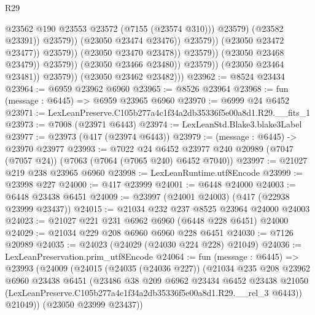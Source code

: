 \begin{lexlean}{R29}
\begin{coremodule}
                                                      @23562
                                                      @190
                                                      @23553
                                                      @23572
                                                      (@7155 (@23574 @310)))
                                                    @23579)
                                                  (@23582 @23391))
                                                @23579))
                                            (@23050 @23474 @23476))
                                          @23579))
                                      (@23050 @23472 @23477))
                                    @23579))
                                (@23050 @23470 @23478))
                              @23579))
                          (@23050 @23468 @23479))
                        @23579))
                    (@23050 @23466 @23480))
                  @23579))
              (@23050 @23464 @23481))
            @23579))
        (@23050 @23462 @23482)))
@23962 := @8524 @23434
@23964 := @6959 @23962 @6960
@23965 := @8526 @23964
@23968 := fun (message : @6445) => @6959 @23965 @6960
@23970 := @6999 @24 @6452
@23971 := LexLeanPreserve.C105b277a4c1f34a2db35336f5e00a8d1.R29.__fits_1
@23973 := @7008 (@23971 @6443)
@23974 := LexLeanStd.Blake3.blake3Label
@23977 := @23973 (@417 (@23974 @6443))
@23979 := (message : @6445) -> @23970 @23977
@23993 := @7022
    @24
    @6452
    @23977
    @240
    @20989
    (@7047 (@7057 @24))
    (@7063 (@7064 (@7065 @240) @6452 @7040))
@23997 := @21027 @219 @238 @23965 @6960
@23998 := LexLeanRuntime.utf8Encode
@23999 := @23998 @227
@24000 := @417 @23999
@24001 := @6448 @24000
@24003 := @6448 @23438 @6451
@24009 := @23997 (@24001 @24003) (@417 (@22938 @23999 @23437))
@24015 := @21034 @232 @237 @8525 @23964 @24000 @24003
@24023 := @21027 @221 @231 @6962 @6960 (@6448 @228 @6451) @24000
@24029 := @21034 @229 @208 @6960 @6960 @228 @6451
@24030 := @7126 @20989
@24035 := @24023 (@24029 (@24030 @224 @228) @21049)
@24036 := LexLeanPreservation.prim_utf8Encode
@24064 := fun (message : @6445) =>
  @23993
    (@24009
      (@24015
        (@24035 (@24036 @227))
        (@21034
          @235
          @208
          @23962
          @6960
          @23438
          @6451
          (@23486
            @38
            @209
            @6962
            @23434
            @6452
            @23438
            @21050
            (LexLeanPreserve.C105b277a4c1f34a2db35336f5e00a8d1.R29.__rel_3 @6443))
          @21049))
      (@23050 @23999 @23437))

\end{coremodule}
\end{lexlean}
